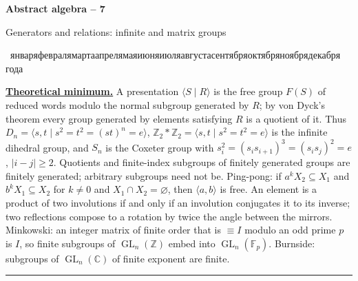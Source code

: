 \documentclass[11pt,a4paper]{article}
\newcommand{\head}[1]{\par\medskip\noindent\textbf{\underline{#1}}\quad}
\newcommand{\rudate}{\number\day~\ifcase\month\or января\or февраля\or марта\or апреля\or мая\or июня\or июля\or августа\or сентября\or октября\or ноября\or декабря\fi~\number\year~года}
\newcommand{\sheettitle}[3]{%
  \begin{center}
  {\huge\bfseries #1\par}\vspace{1.2em}
  {\Large #2\par}\vspace{0.8em}
  \if\relax\detokenize{#3}\relax\else{\Large #3\par}\vspace{0.8em}\fi
  {\foreignlanguage{russian}{\rudate}\par}
  \end{center}\vspace{0.5em}}
\DeclareMathOperator{\GL}{GL}
\newcommand{\Z}{\mathbb Z}
\begin{document}
\sheettitle{Abstract algebra -- 7}{Generators and relations: infinite and matrix groups}{Homework}

\head{Theoretical minimum.} A presentation $\langle S\mid R\rangle$ is the free group $F(S)$ of
reduced words modulo the normal subgroup generated by $R$; by von Dyck's theorem every group
generated by elements satisfying $R$ is a quotient of it. Thus
$D_n=\langle s,t\mid s^2=t^2=(st)^n=e\rangle$, $\Z_2*\Z_2=\langle s,t\mid s^2=t^2=e\rangle$ is
the infinite dihedral group, and $S_n$ is the Coxeter group with
$s_i^2=(s_is_{i+1})^3=(s_is_j)^2=e$, $|i-j|\geqslant2$. Quotients and finite-index subgroups
of finitely generated groups are finitely generated; arbitrary subgroups need not be.
Ping-pong: if $a^kX_2\subseteq X_1$ and $b^kX_1\subseteq X_2$ for $k\neq0$ and
$X_1\cap X_2=\varnothing$, then $\langle a,b\rangle$ is free. An element is a product of two
involutions if and only if an involution conjugates it to its inverse; two reflections compose
to a rotation by twice the angle between the mirrors. Minkowski: an integer matrix of finite
order that is $\equiv I$ modulo an odd prime $p$ is $I$, so finite subgroups of $\GL_n(\Z)$
embed into $\GL_n(\mathbb F_p)$. Burnside: subgroups of $\GL_n(\mathbb C)$ of finite exponent
are finite.

\medskip\noindent\rule{\linewidth}{0.4pt}
\end{document}
